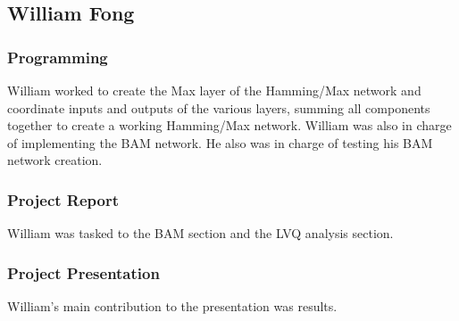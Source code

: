 \documentclass{article}
\begin{document}
\subsection{William Fong}
\subsubsection{Programming}
William worked to create the Max layer of the Hamming/Max network and coordinate 
inputs and outputs of the various layers, summing all components together to create a working Hamming/Max network. William was also in charge of implementing the BAM network. He also was in charge of testing his BAM network creation.
\subsubsection{Project Report}
William was tasked to the BAM section and the LVQ analysis section.

\subsubsection{Project Presentation}
William's main contribution to the presentation was results.
\end{document}
